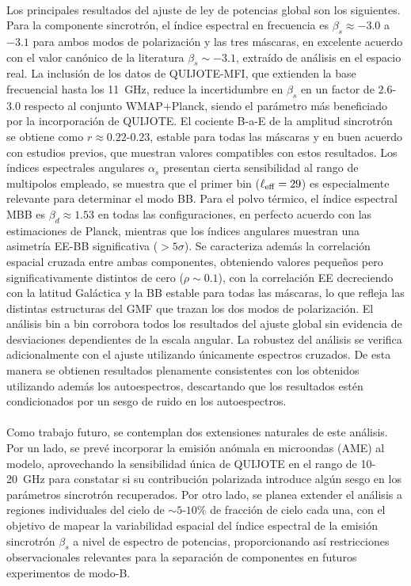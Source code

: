 \paragraph{}

Los principales resultados del ajuste de ley de potencias global son los siguientes. Para la componente sincrotrón, el índice espectral en frecuencia es $\beta_s \approx -3.0$ a $-3.1$ para ambos modos de polarización y las tres máscaras, en excelente acuerdo con el valor canónico de la literatura $\beta_s \sim -3.1$, extraído de análisis en el espacio real. La inclusión de los datos de QUIJOTE-MFI, que extienden la base frecuencial hasta los 11~GHz, reduce la incertidumbre en $\beta_s$ en un factor de $2.6$-$3.0$ respecto al conjunto WMAP+Planck, siendo el parámetro más beneficiado por la incorporación de QUIJOTE. El cociente B-a-E de la amplitud sincrotrón se obtiene como $r \approx 0.22$-$0.23$, estable para todas las máscaras y en buen acuerdo con estudios previos, que muestran valores compatibles con estos resultados. Los índices espectrales angulares $\alpha_s$ presentan cierta sensibilidad al rango de multipolos empleado, se muestra que el primer bin ($\ell_{\rm eff} = 29$) es especialmente relevante para determinar el modo BB. Para el polvo térmico, el índice espectral MBB es $\beta_d \approx 1.53$ en todas las configuraciones, en perfecto acuerdo con las estimaciones de Planck, mientras que los índices angulares muestran una asimetría EE-BB significativa ($>5\sigma$). Se caracteriza además la correlación espacial cruzada entre ambas componentes, obteniendo valores pequeños pero significativamente distintos de cero ($\rho \sim 0.1$), con la correlación EE decreciendo con la latitud Galáctica y la BB estable para todas las máscaras, lo que refleja las distintas estructuras del GMF que trazan los dos modos de polarización. El análisis bin a bin corrobora todos los resultados del ajuste global sin evidencia de desviaciones dependientes de la escala angular. La robustez del análisis se verifica adicionalmente con el ajuste utilizando únicamente espectros cruzados. De esta manera se obtienen resultados plenamente consistentes con los obtenidos utilizando además los autoespectros, descartando que los resultados estén condicionados por un sesgo de ruido en los autoespectros.

\paragraph{}

Como trabajo futuro, se contemplan dos extensiones naturales de este análisis. Por un lado, se prevé incorporar la emisión anómala en microondas (AME) al modelo, aprovechando la sensibilidad única de QUIJOTE en el rango de 10-20~GHz para constatar si su contribución polarizada introduce algún sesgo en los parámetros sincrotrón recuperados. Por otro lado, se planea extender el análisis a regiones individuales del cielo de $\sim 5$-$10\%$ de fracción de cielo cada una, con el objetivo de mapear la variabilidad espacial del índice espectral de la emisión sincrotrón $\beta_s$ a nivel de espectro de potencias, proporcionando así restricciones observacionales relevantes para la separación de componentes en futuros experimentos de modo-B.
